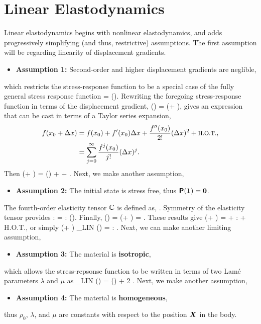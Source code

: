 \section{Linear Elastodynamics}
Linear elastodynamics begins with nonlinear elastodynamics, and adds progressively
simplifying (and thus, restrictive) assumptions.  The first assumption will be regarding
linearity of displacement gradients.  
\begin{itemize}
\item {\bf Assumption 1:} Second-order and higher displacement gradients are 
neglible,  
\end{itemize}
which restricts the stress-response function to be a special 
case of the fully general stress response function
\be
 \tPbold = \tPbold (\tFbold).
\ee
Rewriting the foregoing stress-response function in terms of the displacement 
gradient,
\be
 \tPbold(\tFbold) = \tPbold(\vid + \Grad \vu),
\ee
gives an expression that can be cast in terms of a Taylor series expansion, 
\begin{align}
 f(x_0 + \Delta x) &= f(x_0) + f'(x_0) \Delta x + \frac{f''(x_0)}{2!} (\Delta x)^2 + 
 \mbox{\footnotesize H.O.T.}, \\
 &= \sum_{j=0}^{\infty} \frac{f^j(x_0)}{j!} (\Delta x)^j.
\end{align}
Then 
\be
 \tPbold(\vid + \Grad \vu) = \tPbold(\vid) + \frac{\partial \tPbold(\vid)}{\partial \tFbold}
 \Grad \vu + \left[(\Grad \vu)^2\right].
\ee
Next, we make another assumption,
\begin{itemize}
\item {\bf Assumption 2:} The initial state is stress free, thus $\mbox{\sffamily\bfseries P}(\mbox{\boldmath $1$}) = \mbox{\boldmath $0$}$.
\end{itemize}
The fourth-order elasticity tensor $\mathbb{C}$ is defined as,
\be
 \fotC {} \frac{\partial \tPbold(\vid)}{\partial \tFbold}.
\ee
Symmetry of the elasticity tensor provides
\be
 \fotC \; : \; \Grad \vu \;\;=\;\; \fotC \; : \; \mbox{\sym}(\Grad \vu).
\ee
Finally, 
\be 
 \mbox{\sym}(\Grad \vu) = \half(\Grad \vu + \Grad \vu\transpose) = \ve{\epsilon}.
\ee
These results give
\be
\tPbold(\vid + \Grad \vu) = \vzero \;\;+\;\; \fotC \; : \; \ve{\epsilon} \;\;+\;\; 
 \mbox{\footnotesize H.O.T.},
\ee
or simply
\be
\tPbold(\vid + \Grad \vu)  
\tPbold_{\tiny \mbox{LIN}} (\ve{\epsilon}) = \fotC \; : \; \ve{\epsilon}.
\ee
Next, we can make another limiting assumption, 
\begin{itemize}
\item {\bf Assumption 3:} The material is {\bf isotropic},
\end{itemize}
which allows the stress-repsonse function to be written in terms 
of two Lam\'{e} parameters $\lambda$ and $\mu$ as
\be
 \tPbold_{\mbox{\tiny{LIN}}} (\ve{\epsilon}) 
 = \lambda \; \trace(\ve{\epsilon}) \; \vid + 2 \; \mu \; \ve{\epsilon}.
\ee
Next, we make another assumption, 
\begin{itemize}
\item {\bf Assumption 4:} The material is {\bf homogeneous},
\end{itemize}
thus $\rho_0$, $\lambda$, and $\mu$ are constants with respect to the position $\mbox{\boldmath $X$}$ in the
body.


